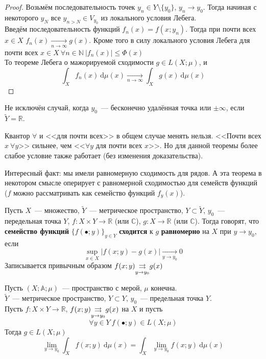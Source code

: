 \documentclass{article}
\begin{document}
    \begin{proof}
        Возьмём последовательность точек $y_n\in Y\setminus\{y_0\}$, $y_n\to y_0$. Тогда начиная с некоторого $y_N$ все $y_{n>N}\in V_{y_0}$ из локального условия Лебега.\\
        Введём последовательность функций $f_n(x)=f(x;y_n)$. Тогда при почти всех $x\in X$ $f_n(x)\underset{n\to\infty}\rightarrow g(x)$. Кроме того в силу локального условия Лебега для почти всех $x\in X~\forall n\in\mathbb N~|f_n(x)|\leqslant\Phi(x)$\\
        То теореме Лебега о мажорируемой сходимости $g\in L(X;\mu)$, и
        $$
        \int_Xf_n(x)~\mathrm d\mu(x)\underset{n\to\infty}\longrightarrow\int_Xg(x)~\mathrm d\mu(x)
        $$
    \end{proof}
    \begin{remark}
        Не исключён случай, когда $y_0$~--- бесконечно удалённая точка или $\pm\infty$, если $\tilde Y=\mathbb R$.
    \end{remark}
    \begin{remark}
        Квантор $\forall$ и <<для почти всех>> в общем случае менять нельзя. <<Почти всех $x~\forall y$>> сильнее, чем <<$\forall y$ для почти всех $x$>>. Но для данной теоремы более слабое условие также работает (без изменения доказательства).
    \end{remark}
    \begin{remark}
        Интересный факт: мы имели равномерную сходимость для рядов. А эта теорема в некотором смысле оперирует с равномерной сходимостью для семейств функций ($f$ можно рассматривать как семейство функций $f_y(x)$).
    \end{remark}
    \begin{definition}
        Пусть $X$~--- множество, $\tilde Y$~--- метрическое пространство, $Y\subset\tilde Y$, $y_0$~--- передельная точка $Y$, $f\colon X\times Y\to\mathbb R$ (или $\mathbb C$), $g\colon X\to\mathbb R$ (или $\mathbb C$). Тогда говорят, что \textbf{семейство функций} $\{f(\bullet;y)\}_{y\in Y}$ \textbf{сходится} к $g$ \textbf{равномерно} на $X$ при $y\to y_0$, если
        $$
        \sup\limits_{x\in X}|f(x;y)-g(x)|\underset{y\to y_0}\longrightarrow0
        $$
        Записывается привычным образом $f(x;y)\underset{y\to y_0}{\operatorname{\rightrightarrows}} g(x)$
    \end{definition}
    \begin{corollary}
        \label{Предельный переход по параметру при условии равномерной сходимости}
        Пусть $(X;\mathbb A;\mu)$~--- пространство с мерой, $\mu$ конечна.\\
        $\tilde Y$~--- метрическое пространство, $Y\subset Y$, $y_0$~--- предельная точка $Y$.\\
        Пусть $f\colon X\times Y\to\mathbb R$, $f(x;y)\underset{y\to y_0}{\operatorname{\rightrightarrows}} g(x)$ на $X$ и пусть
        $$\forall y\in Y~f(\bullet;y)\in L(X;\mu)$$
        Тогда $g\in L(X;\mu)$
        $$
        \lim\limits_{y\to y_0}\int_Xf(x;y)~\mathrm d\mu(x)=\int_X\lim\limits_{y\to y_0}f(x;y)~\mathrm d\mu(x)
        $$
    \end{corollary}
\end{document}
